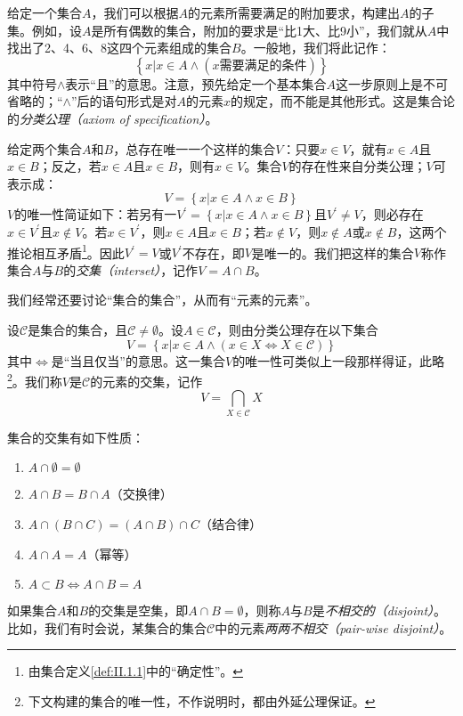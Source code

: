 \documentclass[../main.tex]{subfiles}
\begin{document}
给定一个集合$A$，我们可以根据$A$的元素所需要满足的附加要求，构建出$A$的子集。例如，设$A$是所有偶数的集合，附加的要求是“比1大、比9小”，我们就从$A$中找出了2、4、6、8这四个元素组成的集合$B$。一般地，我们将此记作：
\[
    \left\{x|x\in A\wedge\left(\text{$x$需要满足的条件}\right)\right\}
\]
其中符号$\wedge$表示“且”的意思。注意，预先给定一个基本集合$A$这一步原则上是不可省略的；“$\wedge$”后的语句形式是对$A$的元素$x$的规定，而不能是其他形式。这是集合论的\emph{分类公理（axiom of specification）}。

给定两个集合$A$和$B$，总存在唯一一个这样的集合$V$：只要$x\in V$，就有$x\in A$且$x\in B$；反之，若$x\in A$且$x\in B$，则有$x\in V$。集合$V$的存在性来自分类公理；$V$可表示成：
\[
    V=\left\{x|x\in A\wedge x\in B\right\}
\]
$V$的唯一性简证如下：若另有一$V^\prime=\left\{x|x\in A\wedge x\in B\right\}$且$V^\prime\neq V$，则必存在$x\in V^\prime$且$x\notin V$。若$x\in V^\prime$，则$x\in A$且$x\in B$；若$x\notin V$，则$x\notin A$或$x\notin B$，这两个推论相互矛盾\footnote{由集合定义\ref{def:II.1.1}中的“确定性”。}。因此$V^\prime=V$或$V^\prime$不存在，即$V$是唯一的。我们把这样的集合$V$称作集合$A$与$B$的\emph{交集（interset）}，记作$V=A\cap B$。

我们经常还要讨论“集合的集合”，从而有“元素的元素”。

设$\mathcal{C}$是集合的集合，且$\mathcal{C}\neq\emptyset$。设$A\in\mathcal{C}$，则由分类公理存在以下集合
\[
    V=\left\{x|x\in A\wedge \left(x\in X\Leftrightarrow X\in\mathcal{C}\right)\right\}
\]
其中$\Leftrightarrow$是“当且仅当”的意思。这一集合$V$的唯一性可类似上一段那样得证，此略\footnote{下文构建的集合的唯一性，不作说明时，都由外延公理保证。}。我们称$V$是$\mathcal{C}$的元素的交集，记作
\[
    V=\bigcap_{X\in\mathcal{C}}X
\]

集合的交集有如下性质：
\begin{enumerate}
    \item $A\cap\emptyset=\emptyset$
    \item $A\cap B=B\cap A$（交换律）
    \item $A\cap\left(B\cap C\right)=\left(A\cap B\right)\cap C$（结合律）
    \item $A\cap A=A$（幂等）
    \item $A\subset B\Leftrightarrow A\cap B=A$
\end{enumerate}

如果集合$A$和$B$的交集是空集，即$A\cap B=\emptyset$，则称$A$与$B$是\emph{不相交的（disjoint）}。比如，我们有时会说，某集合的集合$\mathcal{C}$中的元素\emph{两两不相交（pair-wise disjoint）}。
\end{document}
